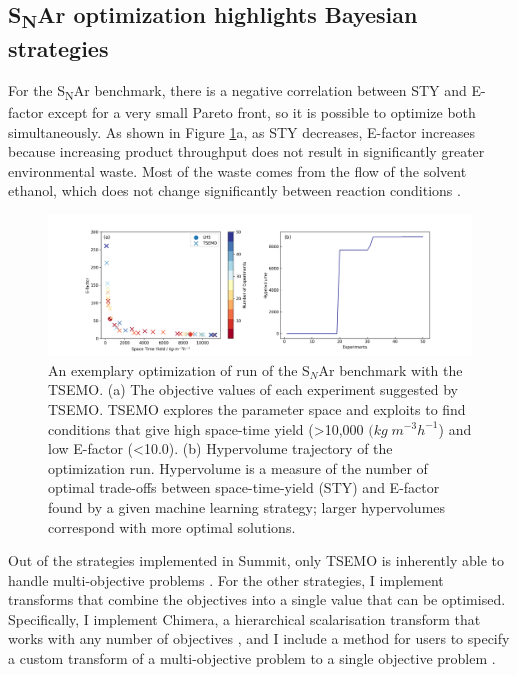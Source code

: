 \subsection{S\textsubscript{N}Ar optimization highlights Bayesian strategies}
For the S\textsubscript{N}Ar benchmark, there is a negative correlation between STY and E-factor except for a very small Pareto front, so it is possible to optimize both simultaneously. As shown in Figure \ref{fig:S$_N$Ar_tsemo}a, as STY decreases, E-factor increases because increasing product throughput does not result in significantly greater environmental waste. Most of the waste comes from the flow of the solvent ethanol, which does not change significantly between reaction conditions \cite{Jeraal2020}.

\begin{figure}
    \centering
    \includegraphics[width=\textwidth]{gfx/Chapter03/snar_tsemo_pareto_hv.png}
    \caption{An exemplary optimization of run of the S$_N$Ar benchmark with the TSEMO. (a) The objective values of each experiment suggested by TSEMO. TSEMO explores the parameter space and exploits to find conditions that give high space-time yield (>10,000 $(kg \; m^{-3} h^{-1}$) and low E-factor (<10.0). (b) Hypervolume trajectory of the optimization run. Hypervolume is a measure of the number of optimal trade-offs between space-time-yield (STY) and E-factor found by a given machine learning strategy; larger hypervolumes correspond with more optimal solutions.}
    \label{fig:S$_N$Ar_tsemo}
\end{figure}

Out of the strategies implemented in Summit, only TSEMO is inherently able to handle multi-objective problems \cite{Bradford2018}. For the other strategies, I implement transforms that combine the objectives into a single value that can be optimised. Specifically, I implement Chimera, a hierarchical scalarisation transform that works with any number of objectives \cite{Hase2018b}, and I include a method for users to specify a custom transform of a multi-objective problem to a single objective problem \cite{Fitzpatrick2016, Epps2020}.

